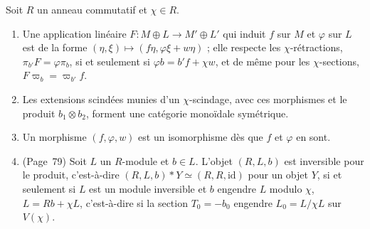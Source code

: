 \begin{encadre}
\begin{theoreme}
Soit $R$ un anneau commutatif et $\chi \in R$.
\begin{enumerate}
\item Une application linéaire $F : M \oplus L \to M' \oplus L'$ qui induit $f$ sur $M$ et $\varphi$ sur $L$ est de la forme $(\eta, \xi) \mapsto (f\eta, \varphi\xi + w\eta)$ ; elle respecte les $\chi$-rétractions, $\pi_{b'} F = \varphi\pi_b$, si et seulement si $\varphi b = b'f + \chi w$, et de même pour les $\chi$-sections, $F\varpi_b = \varpi_{b'}f$.
\item Les extensions scindées munies d'un $\chi$-scindage, avec ces morphismes et le produit $b_1 \otimes b_2$, forment une catégorie monoïdale symétrique.
\item Un morphisme $(f, \varphi, w)$ est un isomorphisme dès que $f$ et $\varphi$ en sont.
\item (Page~79) Soit $L$ un $R$-module et $b \in L$. L'objet $(R, L, b)$ est inversible pour le produit, c'est-à-dire $(R, L, b) * Y \simeq (R, R, \mathrm{id})$ pour un objet $Y$, si et seulement si $L$ est un module inversible et $b$ engendre $L$ modulo $\chi$, $L = Rb + \chi L$, c'est-à-dire si la section $T_0 = -b_0$ engendre $L_0 = L/\chi L$ sur $V(\chi)$.
\end{enumerate}
\end{theoreme}
\end{encadre}

